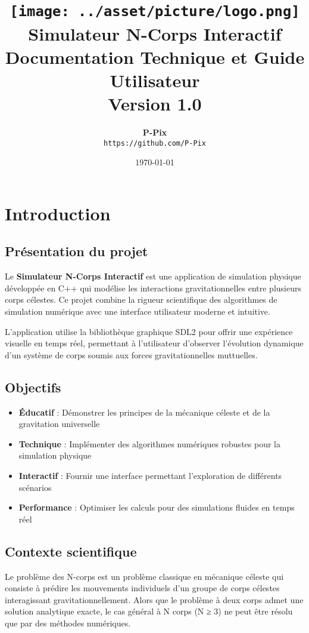 \documentclass[12pt,a4paper]{article}
\title{
    \vspace{-2cm}
    \texttt{[image: ../asset/picture/logo.png]}\\[1cm]
    {\Huge \textbf{Simulateur N-Corps Interactif}}\\[0.5cm]
    {\Large Documentation Technique et Guide Utilisateur}\\[0.3cm]
    {\large Version 1.0}
}
\author{
    \textbf{P-Pix}\\
    \texttt{https://github.com/P-Pix}
}
\date{\today}
\begin{document}
\maketitle
\thispagestyle{empty}

\newpage
\tableofcontents
\newpage

\section{Introduction}

\subsection{Présentation du projet}

Le \textbf{Simulateur N-Corps Interactif} est une application de simulation physique développée en C++ qui modélise les interactions gravitationnelles entre plusieurs corps célestes. Ce projet combine la rigueur scientifique des algorithmes de simulation numérique avec une interface utilisateur moderne et intuitive.

L'application utilise la bibliothèque graphique SDL2 pour offrir une expérience visuelle en temps réel, permettant à l'utilisateur d'observer l'évolution dynamique d'un système de corps soumis aux forces gravitationnelles muttuelles.

\subsection{Objectifs}

\begin{itemize}
    \item \textbf{Éducatif} : Démonstrer les principes de la mécanique céleste et de la gravitation universelle
    \item \textbf{Technique} : Implémenter des algorithmes numériques robustes pour la simulation physique
    \item \textbf{Interactif} : Fournir une interface permettant l'exploration de différents scénarios
    \item \textbf{Performance} : Optimiser les calculs pour des simulations fluides en temps réel
\end{itemize}

\subsection{Contexte scientifique}

Le problème des N-corps est un problème classique en mécanique céleste qui consiste à prédire les mouvements individuels d'un groupe de corps célestes interagissant gravitationnellement. Alors que le problème à deux corps admet une solution analytique exacte, le cas général à N corps (N ≥ 3) ne peut être résolu que par des méthodes numériques.
\end{document}
